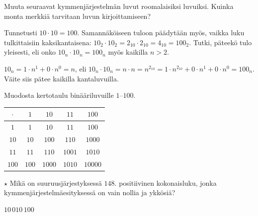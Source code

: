 \begin{tehtavasivu}
\begin{tehtava}
Muuta seuraavat kymmenjärjestelmän luvut roomalaisiksi luvuiksi. Kuinka monta merkkiä tarvitaan luvun kirjoittamiseen?
\begin{vastaus}
\end{vastaus}
\end{tehtava}

\begin{tehtava}
Tunnetusti $10\cdot 10=100$. Samannäköiseen tuloon päädytään myös, vaikka luku tulkittaisiin kaksikantaisena: $10_2 \cdot 10_2 = 2_{10}\cdot 2_{10}=4_{10}=100_2$. Tutki, päteekö tulo yleisesti, eli onko $10_n\cdot 10_n = 100_n$ myös kaikilla $n >2$.
	\begin{vastaus}
$10_n=1\cdot n^1+0\cdot n^0=n$, eli $10_n \cdot 10_n =n\cdot n = n^{2_{10}}= 1\cdot n^{2_{10}} + 0 \cdot n^1 + 0\cdot n^0 =100_n$. Väite siis pätee kaikilla kantaluvuilla.
	\end{vastaus}
\end{tehtava}

\begin{tehtava}
Muodosta kertotaulu binääriluvuille $1$--$100$.
	\begin{vastaus}
\begin{tabular}{|c||c|c|c|c|}
	\hline 
	$\cdot$ & $1$ & $10$ & $11$ & $100$ \\
	\hline
	\hline
	$1$ & $1$ & $10$ & $11$ & $100$ \\
	\hline 
	$10$ & $10$ & $100$ & $110$ & $1000$  \\
	\hline 
	$11$ & $11$ & $110$ & $1001$ & $1010$ \\
	\hline 
	$100$ & $100$ & $1000$ & $1010$ & $10000$ \\
	\hline 
	\end{tabular} 	
	\end{vastaus}
\end{tehtava}

\begin{tehtava}
	$\star$ Mikä on suuruusjärjestyksessä $148$. positiivinen kokonaisluku, jonka kymmenjärjestelmäesityksessä on vain nollia ja ykkösiä?
	\begin{vastaus}
		$10\,010\,100$
	\end{vastaus}
\end{tehtava}

%

\end{tehtavasivu}
